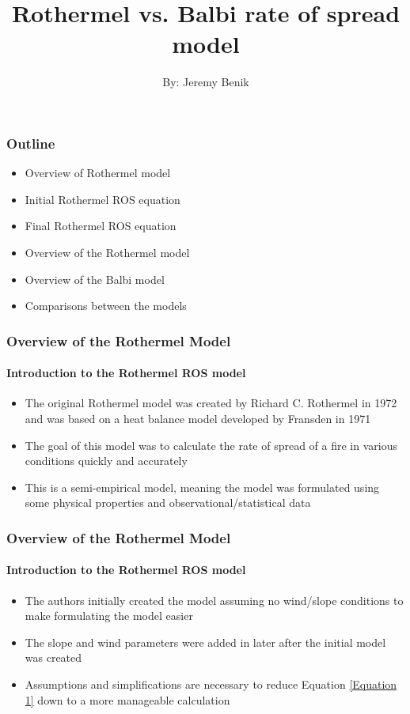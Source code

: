 \documentclass{beamer}
\title{Rothermel vs. Balbi rate of spread model}
\subtitle{By: Jeremy Benik}
\begin{document}
\pagecolor{yellow!30!orange}
	\begin{frame}
		\titlepage
	\end{frame}
	\begin{frame}
		\frametitle{Outline}
		\begin{itemize}
		\setlength{\itemsep}{7mm}
			\item Overview of Rothermel model
			\item Initial Rothermel ROS equation
			\item Final Rothermel ROS equation
			\item Overview of the Rothermel model
			\item Overview of the Balbi model
			\item Comparisons between the models
		\end{itemize}
	\end{frame}
	\begin{frame}
		\frametitle{Overview of the Rothermel Model}
		\framesubtitle{Introduction to the Rothermel ROS model}
		\begin{itemize}
		\setlength{\itemsep}{10mm}
			\item The original Rothermel model was created by Richard C. Rothermel in 1972 and was based on a heat balance model developed by Fransden in 1971
			\item The goal of this model was to calculate the rate of spread of a fire in various conditions quickly and accurately
			\item This is a semi-empirical model, meaning the model was formulated using some physical properties and observational/statistical data

		\end{itemize}
	\end{frame}
	\begin{frame}
			\frametitle{Overview of the Rothermel Model}
		\framesubtitle{Introduction to the Rothermel ROS model}
		\begin{itemize} 
		\setlength{\itemsep}{10mm}
			\item The authors initially created the model assuming no wind/slope conditions to make formulating the model easier
			\item The slope and wind parameters were added in later after the initial model was created
			\item Assumptions and simplifications are necessary to reduce Equation \ref{Equation 1} down to a more manageable calculation
		\end{itemize}
	\end{frame}
\end{document}
